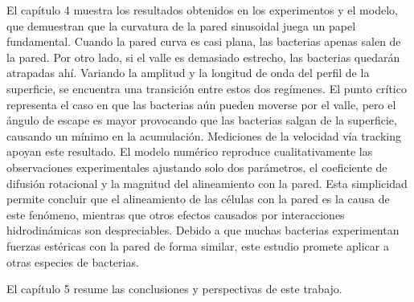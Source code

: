 El capítulo 4 muestra los resultados obtenidos en los experimentos y el modelo, que demuestran que la curvatura de la pared sinusoidal juega un papel fundamental. Cuando la pared curva es casi plana, las bacterias apenas salen de la pared. Por otro lado, si el valle es demasiado estrecho, las bacterias quedarán atrapadas ahí. Variando la amplitud y la longitud de onda del perfil de la superficie, se encuentra una transición entre estos dos regímenes. El punto crítico representa el caso en que las bacterias aún pueden moverse por el valle, pero el ángulo de escape es mayor provocando que las bacterias salgan de la superficie, causando un mínimo en la acumulación. Mediciones de la velocidad vía tracking apoyan este resultado. El modelo numérico reproduce cualitativamente las observaciones experimentales ajustando solo dos parámetros, el coeficiente de difusión rotacional y la magnitud del alineamiento con la pared. Esta simplicidad permite concluir que el alineamiento de las células con la pared es la causa de este fenómeno, mientras que otros efectos causados por interacciones hidrodinámicas son despreciables. Debido a que muchas bacterias experimentan fuerzas estéricas con la pared de forma similar, este estudio promete aplicar a otras especies de bacterias.

El capítulo 5 resume las conclusiones y perspectivas de este trabajo.

